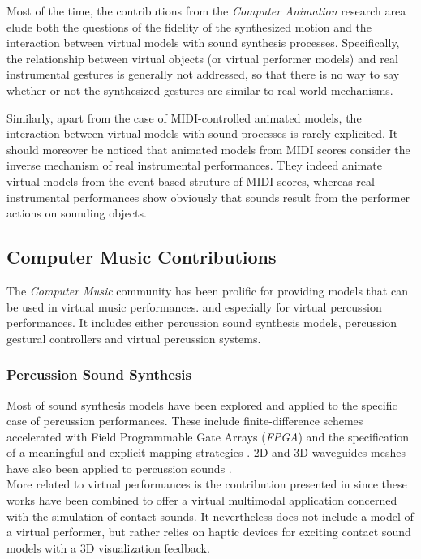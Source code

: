 {{Most of the time, the contributions from the \emph{Computer Animation} research area elude both the questions of the fidelity of the synthesized motion and the interaction between virtual models with sound synthesis processes. Specifically, the relationship between virtual objects (or virtual performer models) and real instrumental gestures is generally not addressed, so that there is no way to say whether or not the synthesized gestures are similar to real-world mechanisms.

Similarly, apart from the case of MIDI-controlled animated models, the interaction between virtual models with sound processes is rarely explicited. It should moreover be noticed that animated models from MIDI scores consider the inverse mechanism of real instrumental performances. They indeed animate virtual models from the event-based struture of MIDI scores, whereas real instrumental performances show obviously that sounds result from the performer actions on sounding objects.

\newpage\vfill


		\subsection{Computer Music Contributions}
		\label{subsec:SMP_CMC}

The \emph{Computer Music} community has been prolific for providing models that can be used in virtual music performances. and especially for virtual percussion performances. It includes either percussion sound synthesis models, percussion gestural controllers and virtual percussion systems.


			\subsubsection{Percussion Sound Synthesis}
			\label{subsec:SMP_CMC_SS}

Most of sound synthesis models have been explored and applied to the specific case of percussion performances. These include finite-difference schemes  accelerated with Field Programmable Gate Arrays (\emph{FPGA})  and the specification of a meaningful and explicit mapping strategies . 2D and 3D waveguides meshes have also been applied to percussion sounds .\\

More related to virtual performances is the contribution presented in  since these works have been combined to offer a virtual multimodal application concerned with the simulation of contact sounds. It nevertheless does not include a model of a virtual performer, but rather relies on haptic devices for exciting contact sound models with a 3D visualization feedback.


}}
